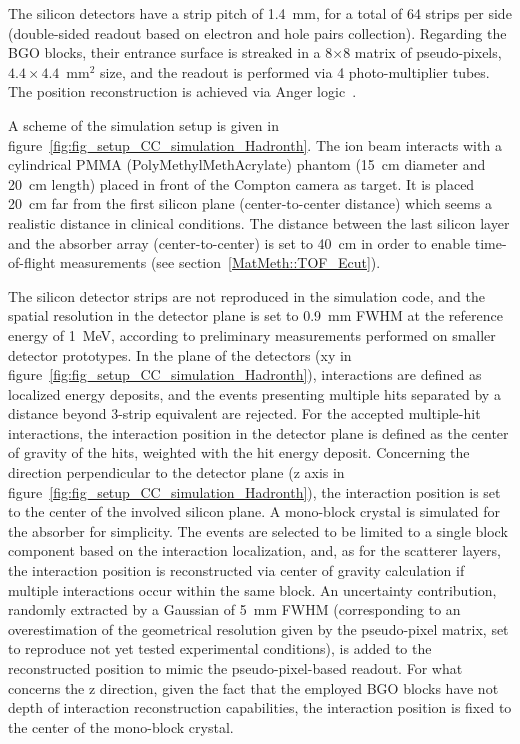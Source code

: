 The silicon detectors have a strip pitch of 1.4~mm, for a total of 64 strips per side (double-sided readout based on electron and hole pairs collection). 
Regarding the BGO blocks, their entrance surface is streaked in a 8$\times$8 matrix of pseudo-pixels, $4.4\times4.4$~mm$^{2}$ size, and the readout is performed via 4 photo-multiplier tubes. The position reconstruction is achieved via Anger logic~\cite{Fontana2018}.

A scheme of the simulation setup is given in figure~\ref{fig:fig_setup_CC_simulation_Hadronth}. The ion beam interacts with a cylindrical PMMA (PolyMethylMethAcrylate) phantom (15~cm diameter and 20~cm length) placed in front of the Compton camera as target. It is placed 20~cm far from the first silicon plane (center-to-center distance) which seems a realistic distance in clinical conditions. The distance between the last silicon layer and the absorber array (center-to-center) is set to 40~cm in order to enable time-of-flight measurements (see section~\ref{MatMeth::TOF_Ecut}).

The silicon detector strips are not reproduced in the simulation code, and the spatial resolution in the detector plane is set to 0.9~mm FWHM at the reference energy of 1~MeV, according to preliminary measurements performed on smaller detector prototypes. In the plane of the detectors (xy in figure~\ref{fig:fig_setup_CC_simulation_Hadronth}), interactions are defined as localized energy deposits, and the events presenting multiple hits separated by a distance beyond 3-strip equivalent are rejected. For the accepted multiple-hit interactions, the interaction position in the detector plane is defined as the center of gravity of the hits, weighted with the hit energy deposit. Concerning the direction perpendicular to the detector plane (z axis in figure~\ref{fig:fig_setup_CC_simulation_Hadronth}), the interaction position is set to the center of the involved silicon plane. A mono-block crystal is simulated for the absorber for simplicity. The events are selected to be limited to a single block component based on the interaction localization, and, as for the scatterer layers, the interaction position is reconstructed via center of gravity calculation if multiple interactions occur within the same block. An uncertainty contribution, randomly extracted by a Gaussian of 5~mm FWHM (corresponding to an overestimation of the geometrical resolution given by the pseudo-pixel matrix, set to reproduce not yet tested experimental conditions), is added to the reconstructed position to mimic the pseudo-pixel-based readout. For what concerns the z direction, given the fact that the employed BGO blocks have not depth of interaction reconstruction capabilities, the interaction position is fixed to the center of the mono-block crystal.

